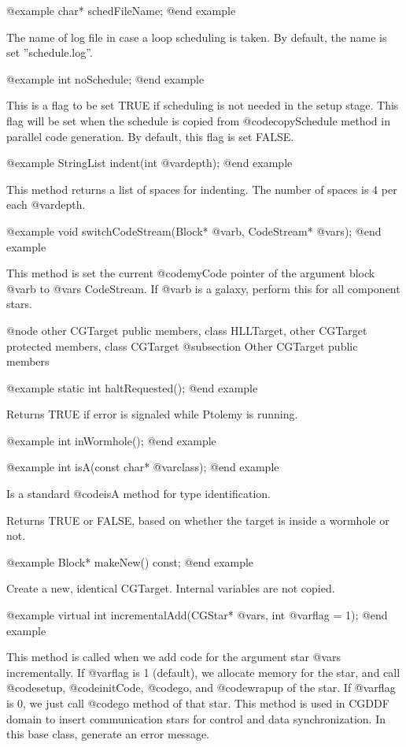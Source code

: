 @example
char* schedFileName;
@end example

The name of log file in case a loop scheduling is taken. By default, the name
is set ''schedule.log''.

@example
int noSchedule;
@end example

This is a flag to be set TRUE if scheduling is not needed in the setup stage.
This flag will be set when the schedule is copied from @code{copySchedule}
method in parallel code generation. By default, this flag is set FALSE.

@example
StringList indent(int @var{depth});
@end example

This method returns a list of spaces for indenting. The number of spaces
is 4 per each @var{depth}.

@example
void switchCodeStream(Block* @var{b}, CodeStream* @var{s});
@end example

This method is set the current @code{myCode} pointer of the argument block
@var{b} to @var{s} CodeStream. If @var{b} is a galaxy, perform this for
all component stars.

@node other CGTarget public members, class HLLTarget, other CGTarget protected members, class CGTarget
@subsection Other CGTarget public members

@example
static int haltRequested();
@end example

Returns TRUE if error is signaled while Ptolemy is running.

@example
int inWormhole();
@end example

@example
int isA(const char* @var{class});
@end example

Is a standard @code{isA} method for type identification.

Returns TRUE or FALSE, based on whether the target is inside a wormhole or not.

@example
Block* makeNew() const;
@end example

Create a new, identical CGTarget. Internal variables are not copied.

@example
virtual int incrementalAdd(CGStar* @var{s}, int @var{flag} = 1);
@end example

This method is called when we add code for the argument star @var{s}
incrementally. If @var{flag} is 1 (default), we allocate memory for the star, 
and call @code{setup}, @code{initCode}, @code{go}, and @code{wrapup} of
the star. If @var{flag} is 0, we just call @code{go} method of that star.
This method is used in CGDDF domain to insert communication stars for
control and data synchronization. In this base class, generate an error
message.

